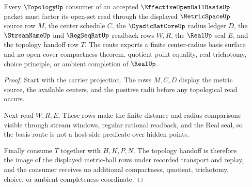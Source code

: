 \begin{theorem}
\label{thm:effective-open-ball-basis-metric-topology-route}
Every $\TopologyUp$ consumer of an accepted $\EffectiveOpenBallBasisUp$ packet must factor its open-set read through the displayed $\MetricSpaceUp$ source row $M$, the center schedule $C$, the $\DyadicRatCoreUp$ radius ledger $D$, the $\StreamNameUp$ and $\RegSeqRatUp$ readback rows $W,R$, the $\RealUp$ seal $E$, and the topology handoff row $T$. The route exports a finite center-radius basis surface and no open-cover compactness theorem, quotient point equality, real trichotomy, choice principle, or ambient completion of $\RealUp$.
\end{theorem}
\begin{proof}
Start with the carrier projection. The rows $M,C,D$ display the metric source, the available centers, and the positive radii before any topological read occurs.

Next read $W,R,E$. These rows make the finite distance and radius comparisons visible through stream windows, regular rational readback, and the Real seal, so the basis route is not a host-side predicate over hidden points.

Finally consume $T$ together with $H,K,P,N$. The topology handoff is therefore the image of the displayed metric-ball rows under recorded transport and replay, and the consumer receives no additional compactness, quotient, trichotomy, choice, or ambient-completeness coordinate.
\end{proof}




